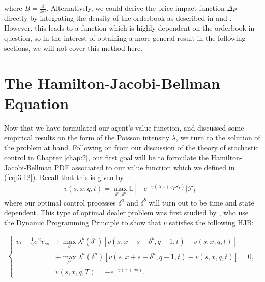 where $B=\frac{\Lambda}{k\alpha}$.
Alternatively, we could derive the price impact function $\Delta p$ directly by 
integrating the density of the orderbook as described in \cite{Weber2005}
and \cite{Smith2003}. However, this leads to a function which is highly dependent
on the orderbook in question, so in the interest of obtaining a more general result
in the following sections, we will not cover this method here.

\newpage
\section{The Hamilton-Jacobi-Bellman Equation}\label{sec:3.7}

Now that we have formulated our agent's value function, and discussed 
some empirical results on the form of the Poisson intensity $\lambda$,
we turn to the solution of the problem at hand. Following on from our 
discussion of the theory of stochastic control in Chapter \ref{chap:2},
our first goal will be to formulate the Hamilton-Jacobi-Bellman PDE
associated to our value function which we defined in (\ref{eq:3.12}).
Recall that this is given by
\begin{equation}
    v(s,x,q,t)=\max\limits_{\delta^a,\delta^b}\mathbb{E}\left[-e^{-\gamma(X_T+q_TS_T)}|\mathcal{F}_t\right]
\end{equation}
where our optimal control processes $\delta^a$ and $\delta^b$ will
turn out to be time and state dependent. This type of optimal dealer 
problem was first studied by \cite{HS1981}, who use the Dynamic Programming 
Principle to show that $v$ satisfies the following HJB:
\begin{theorem}
    \begin{equation}\label{eq:3.17}
        \left\{
            \begin{aligned}
                v_t+\frac{1}{2}\sigma^2v_{ss}&+\max\limits_{\delta^b}\lambda^b(\delta^b)[v(s,x-s+\delta^b,q+1,t)-v(s,x,q,t)]\\
                &+\max\limits_{\delta^a}\lambda^a(\delta^a)[v(s,x+s+\delta^a,q-1,t)-v(s,x,q,t)]=0,\\
                &v(s,x,q,T)=-e^{-\gamma(x+qs)}.
            \end{aligned}
        \right.
    \end{equation}
\end{theorem}
